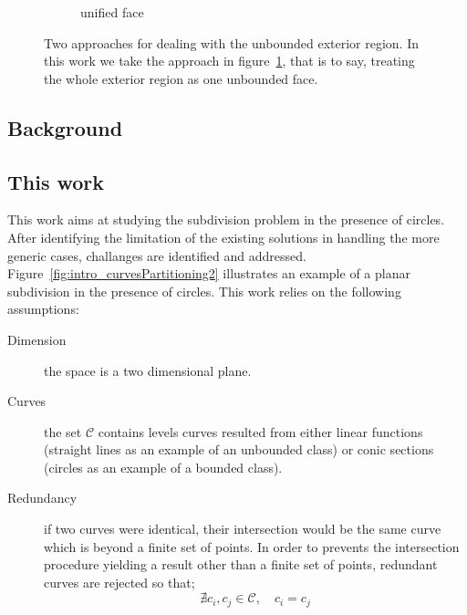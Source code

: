 \begin{figure}
\begin{subfigure}{.32\textwidth}
    \caption{unified face} \label{subfig:intro_unboundedFaces_c}
  \end{subfigure}%
  \caption[xxx]
          {Two approaches for dealing with the unbounded exterior region.
          In this work we take the approach in figure~\ref{subfig:intro_unboundedFaces_c}, that is to say, treating the whole exterior region as one unbounded face.}
  \label{fig:intro_unboundedFaces}
\end{figure}

\subsection{Background}


\subsection{This work}

This work aims at studying the subdivision problem in the presence of circles.
After identifying the limitation of the existing solutions in handling the more generic cases, challanges are identified and addressed.
Figure~\ref{fig:intro_curvesPartitioning2} illustrates an example of a planar subdivision in the presence of circles.
This work relies on the following assumptions:
\begin{description}
\item [Dimension] the space is a two dimensional plane.
\item [Curves] the set $\mathcal{C}$ contains levels curves resulted from either linear functions (straight lines as an example of an unbounded class) or conic sections (circles as an example of a bounded class).
\item [Redundancy] if two curves were identical, their intersection would be the same curve which is beyond a finite set of points.
  In order to prevents the intersection procedure yielding a result other than a finite set of points, redundant curves are rejected so that;
  \[ \nexists c_i , c_j \in \mathcal{C}, \quad c_i = c_j \]
\end{description}

